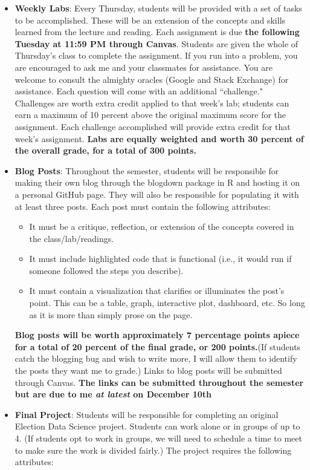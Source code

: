 \documentclass[11pt]{article}
\begin{document}
\begin{itemize}
\item \textbf{Weekly Labs}: Every Thursday, students will be provided with a set of tasks to be accomplished. These will be an extension of the concepts and skills learned from the lecture and reading. Each assignment is due \textbf{the following Tuesday at 11:59 PM through Canvas}. Students are given the whole of Thursday's class to complete the assignment. If you run into a problem, you are encouraged to ask me and your classmates for assistance. You are welcome to consult the almighty oracles (Google and Stack Exchange) for assistance. Each question will come with an additional ``challenge." Challenges are worth extra credit applied to that week's lab; students can earn a maximum of 10 percent above the original maximum score for the assignment. Each challenge accomplished will provide extra credit for that week's assignment. \textbf{Labs are equally weighted and worth 30 percent of the overall grade, for a total of 300 points.}
\item \textbf{Blog Posts}: Throughout the semester, students will be responsible for making their own blog through the blogdown package in R and hosting it on a personal GitHub page. They will also be responsible for populating it with at least three posts. Each post must contain the following attributes:
\begin{itemize}
\item It must be a critique, reflection, or extension of the concepts covered in the class/lab/readings.
\item It must include highlighted code that is functional (i.e., it would run if someone followed the steps you describe).
\item It must contain a visualization that clarifies or illuminates the post's point. This can be a table, graph, interactive plot, dashboard, etc. So long as it is more than simply prose on the page. 
\end{itemize}
\textbf{Blog posts will be worth approximately 7 percentage points apiece for a total of 20 percent of the final grade, or 200 points.}(If students catch the blogging bug and wish to write more, I will allow them to identify the posts they want me to grade.) Links to blog posts will be submitted through Canvas. \textbf{The links can be submitted throughout the semester but are due to me \textit{at latest} on December 10th}

\item \textbf{Final Project}: Students will be responsible for completing an original Election Data Science project. Students can work alone or in groups of up to 4. (If students opt to work in groups, we will need to schedule a time to meet to make sure the work is divided fairly.) The project requires the following attributes:


\end{itemize}
\end{document}
